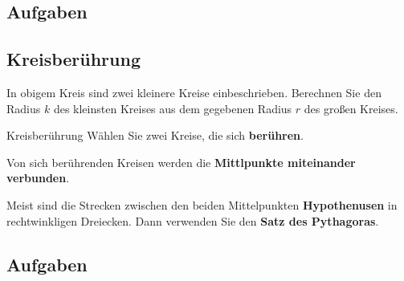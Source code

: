\subsection*{Aufgaben}
\newpage

\subsection{Kreisberührung}


In obigem Kreis sind zwei kleinere Kreise einbeschrieben. Berechnen
Sie den Radius $k$ des kleinsten Kreises aus dem gegebenen Radius $r$ des
großen Kreises.
\newpage


\begin{rezept}{Kreisberührung}{}
  Wählen Sie zwei Kreise, die sich \textbf{berühren}.

  Von sich berührenden Kreisen werden die \textbf{Mittlpunkte miteinander verbunden}.

  Meist sind die Strecken zwischen den beiden Mittelpunkten
  \textbf{Hypothenusen} in rechtwinkligen Dreiecken. Dann verwenden Sie den
  \textbf{Satz des Pythagoras}.
\end{rezept}

\subsection*{Aufgaben}

\newpage
